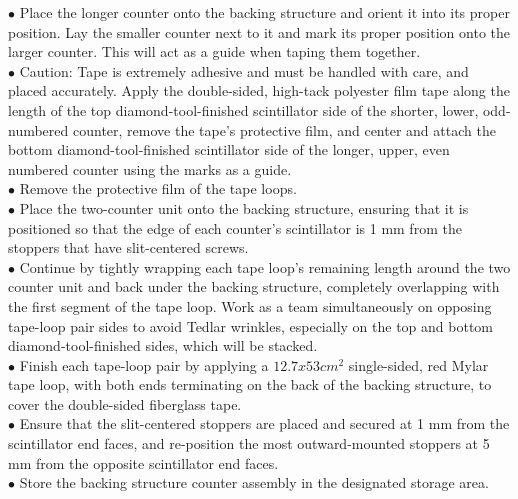 $\bullet$ Place the longer counter onto the backing structure and orient it into its proper
position. Lay the smaller counter next to it and mark its proper position onto the
larger counter. This will act as a guide when taping them together.\\
$\bullet$ Caution: Tape is extremely adhesive and must be handled with care, and
placed accurately. Apply the double-sided, high-tack polyester film tape along
the length of the top diamond-tool-finished scintillator side of the shorter, lower,
odd-numbered counter, remove the tape's protective film, and center and attach
the bottom diamond-tool-finished scintillator side of the longer, upper, even numbered
counter using the marks as a guide.\\
$\bullet$ Remove the protective film of the tape loops.\\
$\bullet$ Place the two-counter unit onto the backing structure, ensuring that it is
positioned so that the edge of each counter's scintillator is 1 mm from the
stoppers that have slit-centered screws.\\
$\bullet$ Continue by tightly wrapping each tape loop's remaining length around the two counter
unit and back under the backing structure, completely overlapping with
the first segment of the tape loop. Work as a team simultaneously on opposing
tape-loop pair sides to avoid Tedlar wrinkles, especially on the top and bottom
diamond-tool-finished sides, which will be stacked.\\

$\bullet$ Finish each tape-loop pair by applying a $12.7 x 53 cm^{2}$
single-sided, red Mylar tape loop, with both ends
terminating on the back of the backing structure, to
cover the double-sided fiberglass tape.\\
$\bullet$ Ensure that the slit-centered stoppers are placed and
secured at 1 mm from the scintillator end faces, and
re-position the most outward-mounted stoppers at 5
mm from the opposite scintillator end faces.\\
$\bullet$ Store the backing structure counter assembly in the
designated storage area.
